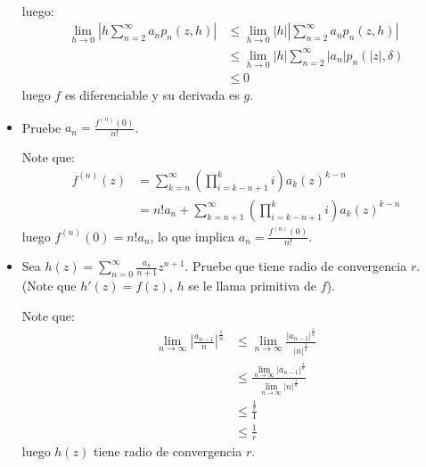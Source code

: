 \begin{homeworkProblem}
\begin{itemize}
\begin{solution}
\begin{align*}
        \end{align*}
        luego:
        \begin{align*}
          \lim_{h \to 0}\left| h\sum_{n=2}^{\infty}a_np_n(z,h) \right|&\leq \lim_{h \to 0}|h|\left| \sum_{n=2}^{\infty}a_np_n(z,h) \right|\\
          &\leq \lim_{h \to 0}|h|\sum_{n=2}^{\infty}|a_n|p_n(|z|,\delta)\\
          &\leq 0
        \end{align*}
        luego $f$ es diferenciable y su derivada es $g$.
        \demostrado
      \end{solution}
    \item Pruebe $a_n=\frac{f^{(n)}(0)}{n!}$.
      \begin{solution}
        Note que:
        \begin{align*}
          f^{(n)}(z)&=\sum_{k=n}^{\infty}\left(\prod_{i=k-n+1}^{k}i\right)a_k(z)^{k-n}\\
          &=n!a_n+\sum_{k=n+1}^{\infty}\left(\prod_{i=k-n+1}^{k}i\right)a_k(z)^{k-n}
        \end{align*}
        luego $f^{(n)}(0)=n!a_n$, lo que implica $a_n=\frac{f^{(n)}(0)}{n!}$.
        \demostrado
      \end{solution}
    \item Sea $h(z)=\sum_{n=0}^{\infty}\frac{a_n}{n+1}z^{n+1}$. Pruebe que tiene radio de convergencia $r$. (Note que $h'(z)=f(z)$, $h$ se le llama primitiva de $f$).
    \begin{solution}
      Note que:
      \begin{align*}
        \lim_{n \to \infty}\left| \frac{a_{n-1}}{n} \right|^{\frac{1}{n}}&\leq \lim_{n \to \infty}\frac{|a_{n-1}|^{\frac{1}{n}}}{|n|^{\frac{1}{n}}}\\
        &\leq \frac{\lim_{n \to \infty}|a_{n-1}|^{\frac{1}{n}}}{\lim_{n \to \infty}|n|^{\frac{1}{n}}}\\
        &\leq \frac{\frac{1}{r}}{1}\\
        &\leq \frac{1}{r}
      \end{align*}
      luego $h(z)$ tiene radio de convergencia $r$.
      \demostrado
    \end{solution}
  \end{itemize}
\end{homeworkProblem}

